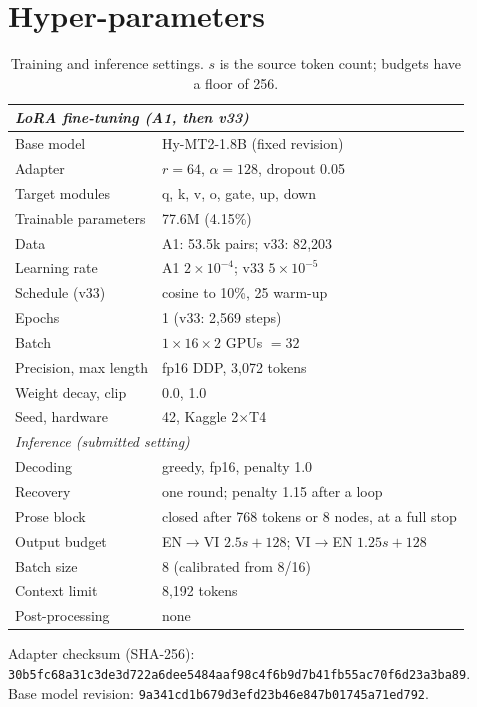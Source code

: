 \section{Hyper-parameters}
\label{app:hyper}
\begin{table}[t]
\centering\small
\begin{tabular}{@{}lp{4.2cm}@{}}
\toprule
\multicolumn{2}{l}{\textit{LoRA fine-tuning (A1, then v33)}}\\
\midrule
Base model & Hy-MT2-1.8B (fixed revision) \\
Adapter & $r{=}64$, $\alpha{=}128$, dropout 0.05 \\
Target modules & q, k, v, o, gate, up, down \\
Trainable parameters & 77.6M (4.15\%) \\
Data & A1: 53.5k pairs; v33: 82{,}203 \\
Learning rate & A1 $2{\times}10^{-4}$; v33 $5{\times}10^{-5}$ \\
Schedule (v33) & cosine to 10\%, 25 warm-up \\
Epochs & 1 (v33: 2{,}569 steps) \\
Batch & $1\times16\times2$ GPUs $=32$ \\
Precision, max length & fp16 DDP, 3{,}072 tokens \\
Weight decay, clip & 0.0, 1.0 \\
Seed, hardware & 42, Kaggle 2$\times$T4 \\
\midrule
\multicolumn{2}{l}{\textit{Inference (submitted setting)}}\\
\midrule
Decoding & greedy, fp16, penalty 1.0 \\
Recovery & one round; penalty 1.15 after a loop \\
Prose block & closed after 768 tokens or 8 nodes, at a full stop \\
Output budget & EN$\to$VI $2.5s{+}128$; VI$\to$EN $1.25s{+}128$ \\
Batch size & 8 (calibrated from 8/16) \\
Context limit & 8{,}192 tokens \\
Post-processing & none \\
\bottomrule
\end{tabular}
\caption{Training and inference settings. $s$ is the source token count; budgets have a floor of 256.}
\label{tab:hyper}
\end{table}

\begingroup\raggedright
\noindent Adapter checksum (SHA-256): {\small\texttt{30b5fc68a31c3de3\allowbreak d722a6dee5484aaf\allowbreak 98c4f6b9d7b41fb5\allowbreak 5ac70f6d23a3ba89}}.\\
\noindent Base model revision: {\small\texttt{9a341cd1b679d3ef\allowbreak d23b46e847b01745\allowbreak a71ed792}}.
\par\endgroup
